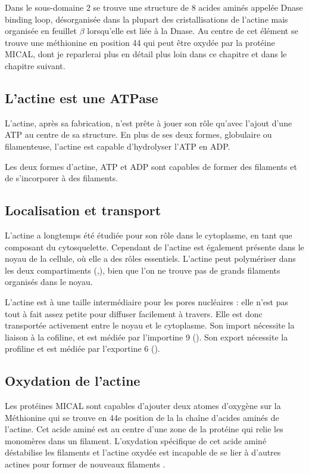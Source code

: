 Dans le sous-domaine 2 se trouve une structure de 8 acides aminés appelée Dnase binding loop, désorganisée dans la plupart des cristallisations de l'actine mais organisée en feuillet $\beta$ lorsqu'elle est liée à la Dnase. Au centre de cet élément se trouve une méthionine en position 44 qui peut être oxydée par la protéine MICAL, dont je reparlerai plus en détail plus loin dans ce chapitre et dans le chapitre suivant. 

\subsection{L'actine est une ATPase}

L'actine, après sa fabrication, n'est prête à jouer son rôle qu'avec l'ajout d'une ATP au centre de sa structure.
En plus de ses deux formes, globulaire ou filamenteuse, l'actine est capable d'hydrolyser l'ATP en ADP.

Les deux formes d'actine, ATP et ADP sont capables de former des filaments et de s'incorporer à des filaments. 


\subsection{Localisation et transport}

L'actine a longtemps été étudiée pour son rôle dans le cytoplasme, en tant que composant du cytosquelette. Cependant de l'actine est également présente dans le noyau de la cellule, où elle a des rôles essentiels. 
L'actine peut polymériser dans les deux compartiments (\cite{mcdonald_nucleoplasmic_2006},\cite{baarlink_nuclear_2013}), bien que l'on ne trouve pas de grands filaments organisés dans le noyau. 

L'actine est à une taille intermédiaire pour les pores nucléaires : elle n'est pas tout à fait assez petite pour diffuser facilement à travers. Elle est donc transportée activement entre le noyau et le cytoplasme. 
Son import nécessite la liaison à la cofiline, et est médiée par l'importine 9 (\cite{dopie_active_2012}). Son export nécessite la profiline et est médiée par l'exportine 6 (\cite{dopie_active_2012}).



\subsection{Oxydation de l'actine}

Les protéines MICAL sont capables d'ajouter deux atomes d'oxygène sur la Méthionine qui se trouve en 44e position de la la chaîne d'acides aminés de l'actine. Cet acide aminé est au centre d'une zone de la protéine qui relie les monomères dans un filament. 
L'oxydation spécifique de cet acide aminé déstabilise les filaments et l'actine oxydée est incapable de se lier à d'autres actines pour former de nouveaux filaments \cite{hung_direct_2011}. 



